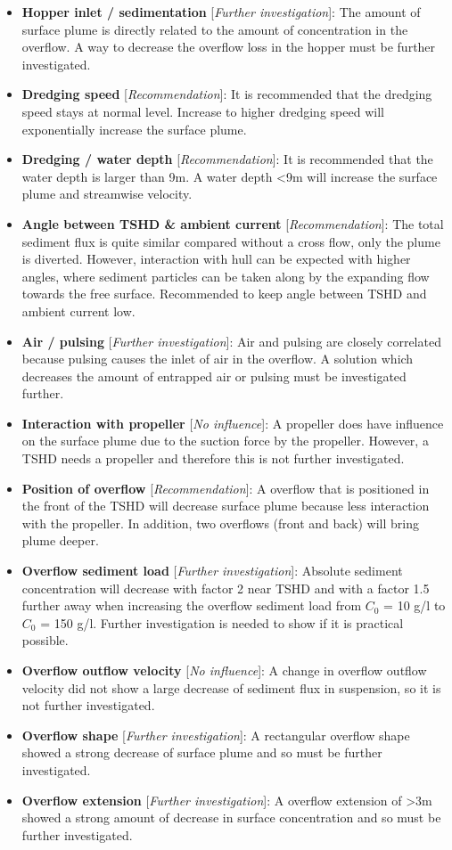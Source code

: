 \newpage
\begin{itemize}
    \item \textbf{Hopper inlet / sedimentation} [\textit{Further investigation}]: The amount of surface plume is directly related to the amount of concentration in the overflow. A way to decrease the overflow loss in the hopper must be further investigated.
    \item \textbf{Dredging speed} [\textit{Recommendation}]: It is recommended that the dredging speed stays at normal level. Increase to higher dredging speed will exponentially increase the surface plume.
    \item \textbf{Dredging / water depth} [\textit{Recommendation}]: It is recommended that the water depth is larger than 9m. A water depth <9m will increase the surface plume and streamwise velocity. 
    \item \textbf{Angle between TSHD \& ambient current} [\textit{Recommendation}]: The total sediment flux is quite similar compared without a cross flow, only the plume is diverted. However, interaction with hull can be expected with higher angles, where sediment particles can be taken along by the expanding flow towards the free surface. Recommended to keep angle between TSHD and ambient current low.
    \item \textbf{Air / pulsing} [\textit{Further investigation}]: Air and pulsing are closely correlated because pulsing causes the inlet of air in the overflow. A solution which decreases the amount of entrapped air or pulsing must be investigated further.
    \item \textbf{Interaction with propeller} [\textit{No influence}]: A propeller does have influence on the surface plume due to the suction force by the propeller. However, a TSHD needs a propeller and therefore this is not further investigated.
    \item \textbf{Position of overflow} [\textit{Recommendation}]: A overflow that is positioned in the front of the TSHD will decrease surface plume because less interaction with the propeller. In addition, two overflows (front and back) will bring plume deeper.
    \item \textbf{Overflow sediment load} [\textit{Further investigation}]: Absolute sediment concentration will decrease with factor 2 near TSHD and with a factor 1.5 further away when increasing the overflow sediment load from $C_0$ = 10 g/l to $C_0$ = 150 g/l. Further investigation is needed to show if it is practical possible.
    \item \textbf{Overflow outflow velocity} [\textit{No influence}]: A change in overflow outflow velocity did not show a large decrease of sediment flux in suspension, so it is not further investigated.
    \item \textbf{Overflow shape} [\textit{Further investigation}]: A rectangular overflow shape showed a strong decrease of surface plume and so must be further investigated.
    \item \textbf{Overflow extension} [\textit{Further investigation}]: A overflow extension of >3m showed a strong amount of decrease in surface concentration and so must be further investigated.
\end{itemize} 







